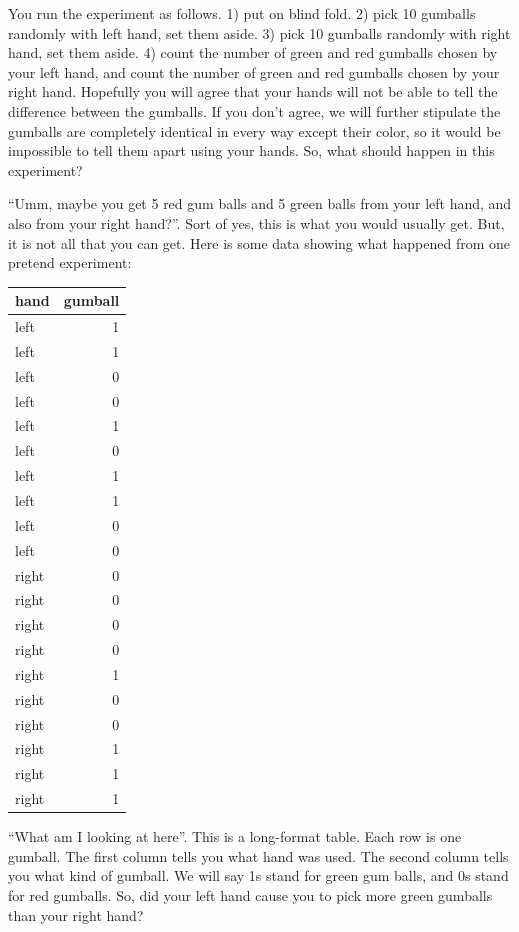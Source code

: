 \documentclass[
]{book}
\begin{document}
You run the experiment as follows. 1) put on blind fold. 2) pick 10 gumballs randomly with left hand, set them aside. 3) pick 10 gumballs randomly with right hand, set them aside. 4) count the number of green and red gumballs chosen by your left hand, and count the number of green and red gumballs chosen by your right hand. Hopefully you will agree that your hands will not be able to tell the difference between the gumballs. If you don't agree, we will further stipulate the gumballs are completely identical in every way except their color, so it would be impossible to tell them apart using your hands. So, what should happen in this experiment?

``Umm, maybe you get 5 red gum balls and 5 green balls from your left hand, and also from your right hand?''. Sort of yes, this is what you would usually get. But, it is not all that you can get. Here is some data showing what happened from one pretend experiment:

\begin{tabular}{l|r}
\hline
hand & gumball\\
\hline
left & 1\\
\hline
left & 1\\
\hline
left & 0\\
\hline
left & 0\\
\hline
left & 1\\
\hline
left & 0\\
\hline
left & 1\\
\hline
left & 1\\
\hline
left & 0\\
\hline
left & 0\\
\hline
right & 0\\
\hline
right & 0\\
\hline
right & 0\\
\hline
right & 0\\
\hline
right & 1\\
\hline
right & 0\\
\hline
right & 0\\
\hline
right & 1\\
\hline
right & 1\\
\hline
right & 1\\
\hline
\end{tabular}

``What am I looking at here''. This is a long-format table. Each row is one gumball. The first column tells you what hand was used. The second column tells you what kind of gumball. We will say 1s stand for green gum balls, and 0s stand for red gumballs. So, did your left hand cause you to pick more green gumballs than your right hand?
\end{document}
